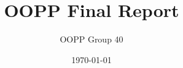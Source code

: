 \documentclass[a4paper,12p,titlepage]{report}
\begin{document}
\title{OOPP Final Report}
\date{\today}
\author{OOPP Group 40}

\maketitle
\tableofcontents












\end{document}
